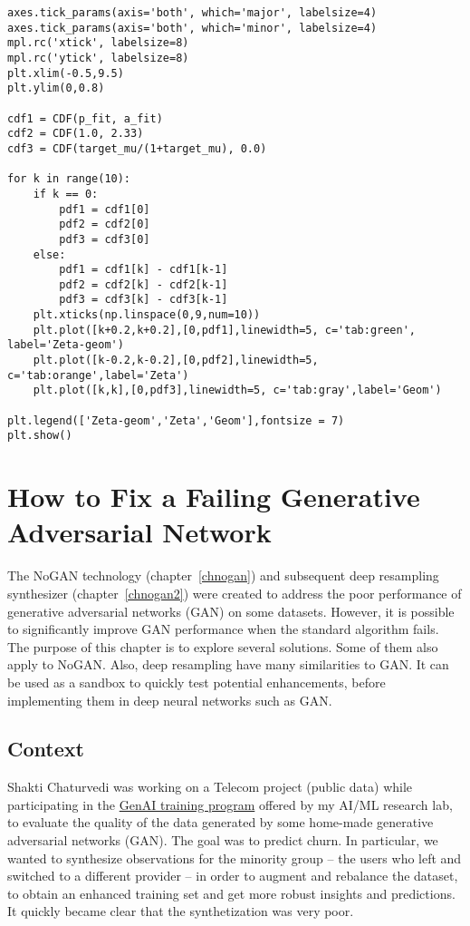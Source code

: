 \documentclass[oneside,10pt]{book}
\begin{document}
\begin{lstlisting}
axes.tick_params(axis='both', which='major', labelsize=4)
axes.tick_params(axis='both', which='minor', labelsize=4)
mpl.rc('xtick', labelsize=8) 
mpl.rc('ytick', labelsize=8) 
plt.xlim(-0.5,9.5)
plt.ylim(0,0.8)

cdf1 = CDF(p_fit, a_fit) 
cdf2 = CDF(1.0, 2.33) 
cdf3 = CDF(target_mu/(1+target_mu), 0.0) 

for k in range(10):
    if k == 0:
        pdf1 = cdf1[0]
        pdf2 = cdf2[0]
        pdf3 = cdf3[0]
    else:
        pdf1 = cdf1[k] - cdf1[k-1]
        pdf2 = cdf2[k] - cdf2[k-1]
        pdf3 = cdf3[k] - cdf3[k-1]
    plt.xticks(np.linspace(0,9,num=10))
    plt.plot([k+0.2,k+0.2],[0,pdf1],linewidth=5, c='tab:green', label='Zeta-geom')
    plt.plot([k-0.2,k-0.2],[0,pdf2],linewidth=5, c='tab:orange',label='Zeta')
    plt.plot([k,k],[0,pdf3],linewidth=5, c='tab:gray',label='Geom')

plt.legend(['Zeta-geom','Zeta','Geom'],fontsize = 7)
plt.show()
\end{lstlisting}


\chapter{How to Fix a Failing Generative Adversarial Network}\label{failinggan}

The NoGAN technology (chapter~\ref{chnogan}) and subsequent deep resampling synthesizer (chapter~\ref{chnogan2}) were created to address 
 the poor performance of generative adversarial networks (GAN) on some datasets. However, it is possible to significantly improve GAN performance
 when the standard algorithm fails. The purpose of this chapter is to explore several solutions. Some of them also apply to NoGAN. Also, deep
 resampling have many similarities to GAN. It can be used as a sandbox to quickly test potential enhancements, before implementing them in
  deep neural networks such as GAN.


\section{Context}\label{context}

Shakti Chaturvedi was working on a Telecom project (public data)
 while participating in the \href{https://mltblog.com/3pWxvZK}{GenAI training program} offered by my AI/ML research lab, to evaluate the
 quality of the data generated by some home-made \textcolor{index}{generative adversarial networks} (GAN).
 The goal was to predict churn. In particular, we wanted to synthesize observations for the minority group -- the users who left and switched to
 a different provider -- in order to augment and rebalance the dataset, to obtain an enhanced training set and get more robust insights and predictions.  
It quickly became clear that the synthetization was very poor. 
\end{document}

